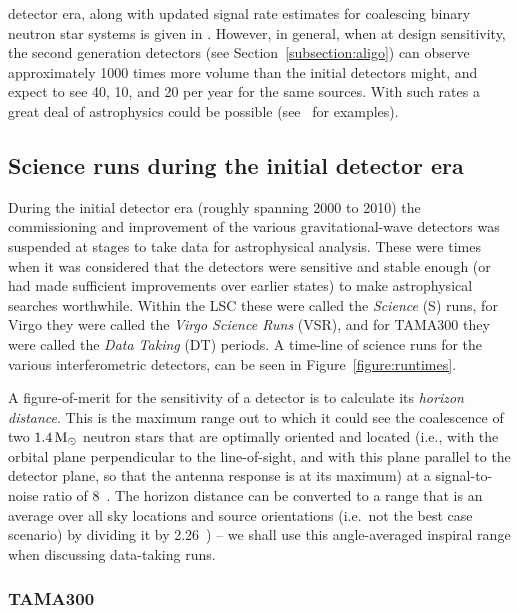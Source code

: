 detector era, along with updated signal rate estimates for coalescing binary neutron star systems is given 
in \cite{lrr-2016-1}. However, in general, when at design sensitivity, the second generation detectors (see 
Section~\ref{subsection:aligo}) can observe approximately 1000 times more volume than the initial detectors 
might, and expect to see 40, 10, and 20 per year for the same sources. With such rates a great deal of 
astrophysics could be possible (see~\cite{Sathyaprakash:2009} for examples).

\subsection{Science runs during the initial detector era}
\label{subsection:runs} 

During the initial detector era (roughly spanning 2000 to 2010) the commissioning and improvement of the 
various gravitational-wave detectors was suspended at stages to take data for astrophysical analysis. These 
were times when it was considered that the detectors were sensitive and stable enough (or had made sufficient
improvements over earlier states) to make astrophysical searches worthwhile. Within the LSC these were called 
the \textit{Science} (S) runs, for Virgo they were called the \textit{Virgo Science Runs} (VSR), and for 
TAMA300 they were called the \textit{Data Taking} (DT) periods. A time-line of science runs for the various
interferometric detectors, can be seen in Figure~\ref{figure:runtimes}. 

A figure-of-merit for the sensitivity of a detector is to calculate its \textit{horizon distance}. This is 
the maximum range out to which it could see the coalescence of two $1.4\,{\rm M}_{\odot}$ neutron stars
that are optimally oriented and located (i.e., with the orbital plane perpendicular to the line-of-sight, and 
with this plane parallel to the detector plane, so that the antenna response is at its maximum) at
a signal-to-noise ratio of 8~\cite{Abbott:2005b}. The horizon distance can be converted to a range that is an 
average over all sky locations and source orientations (i.e.\ not the best case scenario) by dividing
it by 2.26~\cite{Sutton:2003}) -- we shall use this angle-averaged inspiral range when discussing data-taking runs.

\subsubsection{TAMA300}

